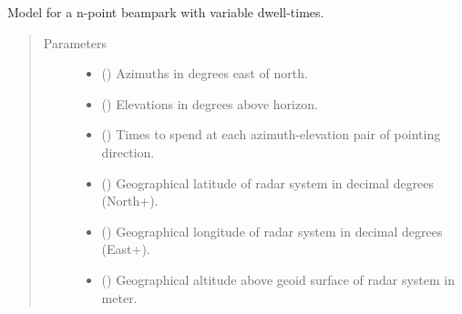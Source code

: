 \documentclass[letterpaper,10pt,english]{sphinxmanual}
\begin{document}
\begin{fulllineitems}
\label{\detokenize{modules/radar_scan_library:radar_scan_library.n_dyn_dwell_pointing_model}}
Model for a n-point beampark with variable dwell-times.
\begin{quote}\begin{description}
\item[{Parameters}] \leavevmode\begin{itemize}
\item {} 
 () \textendash{} Azimuths in degrees east of north.

\item {} 
 () \textendash{} Elevations in degrees above horizon.

\item {} 
 () \textendash{} Times to spend at each azimuth-elevation pair of pointing direction.

\item {} 
 () \textendash{} Geographical latitude of radar system in decimal degrees  (North+).

\item {} 
 () \textendash{} Geographical longitude of radar system in decimal degrees (East+).

\item {} 
 () \textendash{} Geographical altitude above geoid surface of radar system in meter.

\end{itemize}

\end{description}\end{quote}

\end{fulllineitems}

\end{document}

